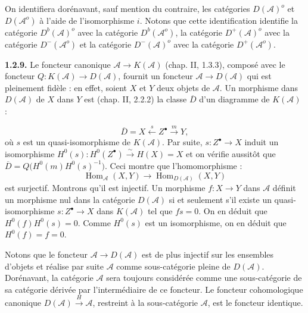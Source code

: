 \clearpage
{}%
\begingroup\small\setlength{\parskip}{0pt}\setlength{\emergencystretch}{1.5em}
\setlength{\abovedisplayskip}{4pt plus 2pt minus 2pt}%
\setlength{\belowdisplayskip}{4pt plus 2pt minus 2pt}%

On identifiera dorénavant, sauf mention du contraire, les catégories
$D(\mathcal A)^o$ et $D(\mathcal A^o)$ à l'aide de l'isomorphisme $i$.
Notons que cette identification identifie la catégorie $D^b(\mathcal A)^o$
avec la catégorie $D^b(\mathcal A^o)$, la catégorie $D^+(\mathcal A)^o$
avec la catégorie $D^-(\mathcal A^o)$ et la catégorie $D^-(\mathcal A)^o$
avec la catégorie $D^+(\mathcal A^o)$.

\medskip\noindent\textbf{1.2.9.}\quad
Le foncteur canonique $\mathcal A\longrightarrow K(\mathcal A)$
(chap. II, 1.3.3), composé avec le foncteur
$Q\colon K(\mathcal A)\longrightarrow D(\mathcal A)$, fournit un foncteur
$\mathcal A\longrightarrow D(\mathcal A)$ qui est pleinement fidèle : en
effet, soient $X$ et $Y$ deux objets de $\mathcal A$. Un morphisme dans
$D(\mathcal A)$ de $X$ dans $Y$ est (chap. II, 2.2.2) la classe
$\overline D$ d'un diagramme de $K(\mathcal A)$ :

\[
\overline D=X\xleftarrow{\ s\ }Z^\bullet\xrightarrow{\ m\ }Y,
\]
où $s$ est un quasi-isomorphisme de $K(\mathcal A)$. Par suite,
$s\colon Z^\bullet\longrightarrow X$ induit un isomorphisme
$H^0(s)\colon H^0(Z^\bullet)\xrightarrow{\sim}H(X)=X$ et on vérifie
aussitôt que
$\overline D=Q\bigl(H^0(m)H^0(s)^{-1}\bigr)$. Ceci montre que
l'homomorphisme :
\[
\operatorname{Hom}_{\mathcal A}(X,Y)\longrightarrow
\operatorname{Hom}_{D(\mathcal A)}(X,Y)
\]
est surjectif. Montrons qu'il est injectif. Un morphisme
$f\colon X\longrightarrow Y$ dans $\mathcal A$ définit un morphisme nul dans
la catégorie $D(\mathcal A)$ si et seulement s'il existe un
quasi-isomorphisme $s\colon Z^\bullet\longrightarrow X$ dans $K(\mathcal A)$
tel que $fs=0$. On en déduit que $H^0(f)H^0(s)=0$. Comme $H^0(s)$ est un
isomorphisme, on en déduit que $H^0(f)=f=0$.

Notons que le foncteur $\mathcal A\longrightarrow D(\mathcal A)$ est de plus
injectif sur les ensembles d'objets et réalise par suite $\mathcal A$ comme
sous-catégorie pleine de $D(\mathcal A)$. Dorénavant, la catégorie
$\mathcal A$ sera toujours considérée comme une sous-catégorie de sa
catégorie dérivée par l'intermédiaire de ce foncteur. Le foncteur
cohomologique canonique $D(\mathcal A)\xrightarrow{H}\mathcal A$, restreint
à la sous-catégorie $\mathcal A$, est le foncteur identique.

